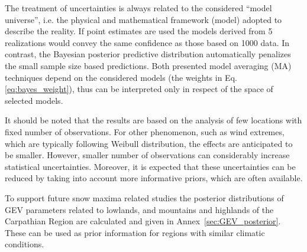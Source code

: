 The treatment of uncertainties is always related to the  considered  ``model universe'',  i.e.  the  physical and mathematical framework (model) adopted to describe  the  reality.
If point estimates are used the models derived from 5 realizations would convey the same confidence as those based on 1000 data. In contrast, the Bayesian posterior predictive distribution automatically penalizes the small sample size based predictions.
Both presented model averaging (MA) techniques depend on the considered models (the weights in Eq.\ref{eq:bayes_weight}), thus can be interpreted only in respect of the space of selected models.

It should be noted that the results are based on the analysis of few locations with fixed number of observations. For other phenomenon, such as wind extremes, which are typically following Weibull distribution, the effects are anticipated to be smaller. However, smaller number of observations can considerably increase statistical uncertainties. Moreover, it is expected that these uncertainties can be reduced by taking into account more informative priors, which are often available. 

To support future snow maxima related studies the posterior distributions of GEV parameters related to lowlands, and mountains and highlands of the Carpathian Region are calculated and given in Annex~\ref{sec:GEV_posterior}. These can be used as prior information for regions with similar climatic conditions.


%
%


